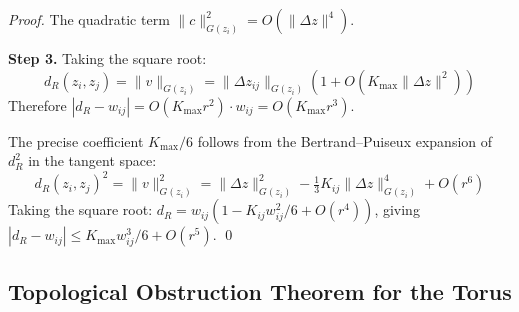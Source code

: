 \documentclass{article}
\begin{document}
\begin{proofbox}
\begin{proof}
The quadratic term $\|c\|^2_{G(z_i)} = O(\|\Delta z\|^4)$.

\textbf{Step 3.} Taking the square root:
\[
  d_R(z_i, z_j) = \|v\|_{G(z_i)} = \|\Delta z_{ij}\|_{G(z_i)}
  \left(1 + O(K_{\max}\|\Delta z\|^2)\right)
\]
Therefore $|d_R - w_{ij}| = O(K_{\max} r^2) \cdot w_{ij} = O(K_{\max} r^3)$.

The precise coefficient $K_{\max}/6$ follows from the Bertrand--Puiseux
expansion of $d_R^2$ in the tangent space:
\[
  d_R(z_i, z_j)^2 = \|v\|^2_{G(z_i)} = \|\Delta z\|^2_{G(z_i)}
  - \tfrac{1}{3}K_{ij}\|\Delta z\|^4_{G(z_i)} + O(r^6)
\]
Taking the square root: $d_R = w_{ij}(1 - K_{ij} w_{ij}^2/6 + O(r^4))$,
giving $|d_R - w_{ij}| \leq K_{\max} w_{ij}^3/6 + O(r^5)$. \qed
\end{proof}
\end{proofbox}

\subsection{Topological Obstruction Theorem for the Torus}
\label{sec:bridge_torus}
\end{document}
